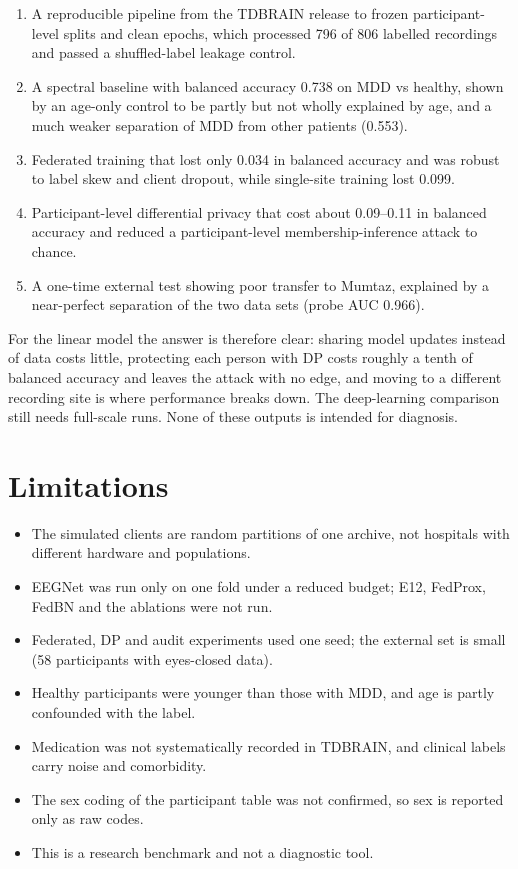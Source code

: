 \documentclass[12pt,a4paper,oneside]{report}
\begin{document}
\begin{enumerate}[leftmargin=1.6em,itemsep=2pt,topsep=2pt]
\item A reproducible pipeline from the TDBRAIN release to frozen participant-level splits and clean epochs, which processed 796 of 806 labelled recordings and passed a shuffled-label leakage control.
\item A spectral baseline with balanced accuracy 0.738 on MDD vs healthy, shown by an age-only control to be partly but not wholly explained by age, and a much weaker separation of MDD from other patients (0.553).
\item Federated training that lost only 0.034 in balanced accuracy and was robust to label skew and client dropout, while single-site training lost 0.099.
\item Participant-level differential privacy that cost about 0.09--0.11 in balanced accuracy and reduced a participant-level membership-inference attack to chance.
\item A one-time external test showing poor transfer to Mumtaz, explained by a near-perfect separation of the two data sets (probe AUC 0.966).
\end{enumerate}
For the linear model the answer is therefore clear: sharing model updates instead of data costs little, protecting each person with DP costs roughly a tenth of balanced accuracy and leaves the attack with no edge, and moving to a different recording site is where performance breaks down. The deep-learning comparison still needs full-scale runs. None of these outputs is intended for diagnosis.


\section{Limitations}
\begin{itemize}[leftmargin=1.6em,itemsep=2pt,topsep=2pt]
\item The simulated clients are random partitions of one archive, not hospitals with different hardware and populations.
\item EEGNet was run only on one fold under a reduced budget; E12, FedProx, FedBN and the ablations were not run.
\item Federated, DP and audit experiments used one seed; the external set is small (58 participants with eyes-closed data).
\item Healthy participants were younger than those with MDD, and age is partly confounded with the label.
\item Medication was not systematically recorded in TDBRAIN, and clinical labels carry noise and comorbidity.
\item The sex coding of the participant table was not confirmed, so sex is reported only as raw codes.
\item This is a research benchmark and not a diagnostic tool.
\end{itemize}
\end{document}
